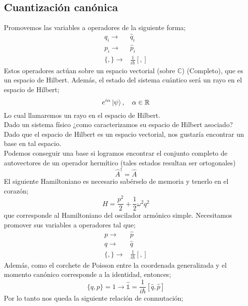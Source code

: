 \documentclass[../main.tex]{subfiles}
\begin{document}
  \subsection{Cuantización canónica}
  Promovemos las variables a operadores de la siguiente forma;
  \begin{align}
    q_i \rightarrow & \hat{q}_i \\
    p_i \rightarrow &\hat{p}_i \\
    \{,\} \rightarrow &\frac{1}{i\hbar} [,]
  \end{align}
  Estos operadores actúan sobre un espacio vectorial (sobre $\mathbb{C}$) (Completo), que es un espacio de Hilbert. Además, el estado del sistema cuántico será un rayo en el espacio de Hilbert;
  \begin{equation}
    e^{i\alpha }\ket{\psi}, \quad \alpha\in\mathbb{R}
   \end{equation}
   Lo cual llamaremos un rayo en el espacio de Hilbert. \\
   Dado un sistema físico ¿como caracterizamos su espacio de Hilbert asociado? \\
   Dado que el espacio de Hilbert es un espacio vectorial, nos gustaría encontrar un base en tal espacio. \\
   Podemos conseguir una base si logramos encontrar el conjunto completo de autovectores de un operador hermítico (tales estados resultan ser ortogonales)
   \begin{equation}
     \hat{A}^\dagger = \hat{A}
    \end{equation}
El siguiente Hamiltoniano es necesario sabérselo de memoria y tenerlo en el corazón;
\begin{equation}
  H = \frac{p^2}{2} + \frac{1}{2}\omega^2 q^2
 \end{equation}
 que corresponde al Hamiltoniano del oscilador armónico simple. Necesitamos promover sus variables a operadores tal que;
 \begin{align}
   p \rightarrow & \hat{p} \\
   q \rightarrow & \hat{q} \\
   \{,\}\rightarrow & \frac{1}{i\hbar}[,]
 \end{align}
 Además, como el corchete de Poisson entre la coordenada generalizada y el momento canónico corresponde a la identidad, entonces;
 \begin{equation}
   \{q,p\} = 1 \rightarrow \hat{\mathbb{1}} = \frac{1}{i\hbar}[\hat{q},\hat{p}] 
  \end{equation}
  Por lo tanto nos queda la siguiente relación de conmutación;
\end{document}
